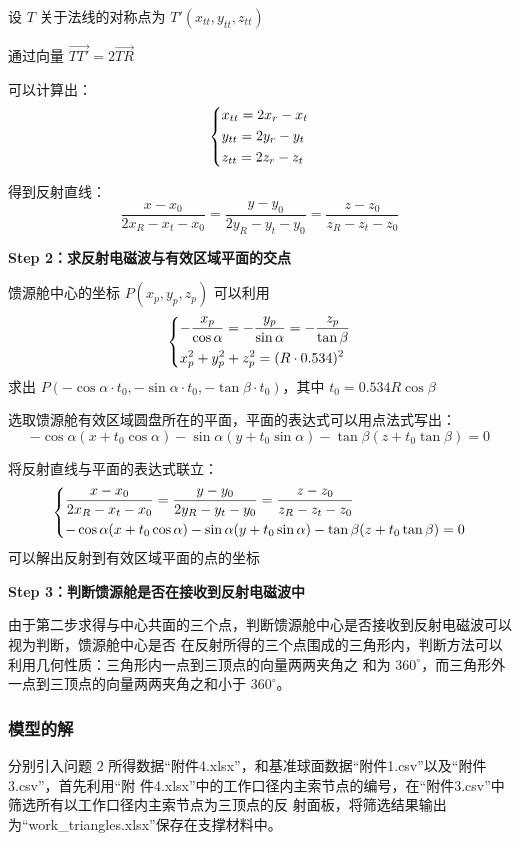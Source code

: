 \documentclass[withoutpreface,bwprint]{cumcmthesis} %
\begin{document}
设 $T$ 关于法线的对称点为 $T'(x_{tt},y_{tt},z_{tt})$

通过向量 $\overrightarrow{TT'}=2\overrightarrow{TR}$

可以计算出：
\[
    \begin{dcases}
        x_{tt}=2x_r-x_t \\
        y_{tt}=2y_r-y_t \\
        z_{tt}=2z_r-z_t \\
    \end{dcases}
\]

得到反射直线：
\[
    \frac{x-x_0}{2x_R-x_t-x_0} = \frac{y-y_0}{2y_R-y_t-y_0} = 
    \frac{z-z_0}{z_R-z_t-z_0}
\]

\textbf{Step 2：求反射电磁波与有效区域平面的交点}

馈源舱中心的坐标 $P(x_p,y_p,z_p)$ 可以利用
\[
    \begin{dcases}
        -\frac{x_p}{\cos\alpha} = -\frac{y_p}{\sin\alpha} = -\frac{z_p}{\tan\beta} \\
        x_p^2 + y_p^2 + z_p^2 = (R \cdot 0.534)^2
    \end{dcases}
\]
求出 $P(-\cos\alpha\cdot t_0,-\sin\alpha \cdot t_0,-\tan\beta\cdot t_0)$，其中
$t_0 = 0.534R\cos\beta$

选取馈源舱有效区域圆盘所在的平面，平面的表达式可以用点法式写出：
\[
    -\cos\alpha(x + t_0\cos\alpha) - \sin\alpha(y + t_0\sin\alpha) - 
    \tan\beta(z + t_0\tan\beta) = 0 
\]

将反射直线与平面的表达式联立：
\[
    \begin{dcases}
        \frac{x-x_0}{2x_R-x_t-x_0} = \frac{y-y_0}{2y_R-y_t-y_0} = 
        \frac{z-z_0}{z_R-z_t-z_0}  \\
        -\cos\alpha(x + t_0\cos\alpha) - \sin\alpha(y + t_0\sin\alpha) - 
        \tan\beta(z + t_0\tan\beta) = 0 
    \end{dcases}
\]
可以解出反射到有效区域平面的点的坐标

\textbf{Step 3：判断馈源舱是否在接收到反射电磁波中}

由于第二步求得与中心共面的三个点，判断馈源舱中心是否接收到反射电磁波可以视为判断，馈源舱中心是否
在反射所得的三个点围成的三角形内，判断方法可以利用几何性质：三角形内一点到三顶点的向量两两夹角之
和为 $360^\circ$，而三角形外一点到三顶点的向量两两夹角之和小于 $360^\circ$。
\subsubsection{模型的解}
分别引入问题 $2$ 所得数据“附件4.xlsx”，和基准球面数据“附件1.csv”以及“附件3.csv”，首先利用“附
件4.xlsx”中的工作口径内主索节点的编号，在“附件3.csv”中筛选所有以工作口径内主索节点为三顶点的反
射面板，将筛选结果输出为“work\_triangles.xlsx”保存在支撑材料中。
\end{document}
